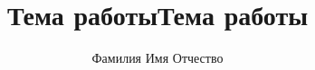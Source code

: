 \documentclass{../../cls/fefu}
\author{Фамилия Имя Отчество}
\title{Тема работы}
\begin{document}
    \title{Тема работы}
    
    \setcounter{page}{4}
    
    \tableofcontents
    
    \newpage
    
    \newpage
    
    \newpage
    
    \newpage
    
    \newpage
    
    \newpage
    \newpage
    
\end{document}
